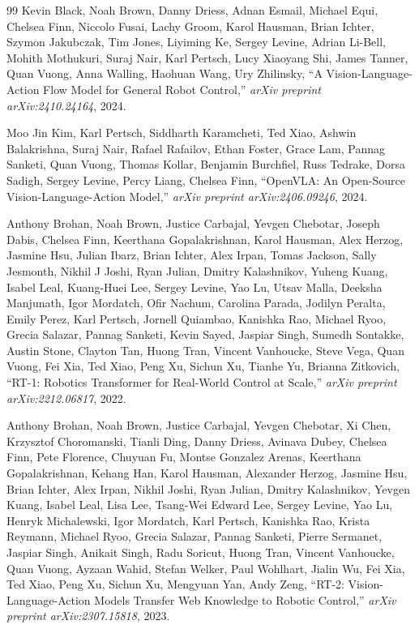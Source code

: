 \documentclass[11pt]{article}
\begin{document}
\begin{thebibliography}{99}
Kevin Black, Noah Brown, Danny Driess, Adnan Esmail, Michael Equi, Chelsea Finn, Niccolo Fusai, Lachy Groom, Karol Hausman, Brian Ichter, Szymon Jakubczak, Tim Jones, Liyiming Ke, Sergey Levine, Adrian Li-Bell, Mohith Mothukuri, Suraj Nair, Karl Pertsch, Lucy Xiaoyang Shi, James Tanner, Quan Vuong, Anna Walling, Haohuan Wang, Ury Zhilinsky,
``A Vision-Language-Action Flow Model for General Robot Control,''
\textit{arXiv preprint arXiv:2410.24164}, 2024.

Moo Jin Kim, Karl Pertsch, Siddharth Karamcheti, Ted Xiao, Ashwin Balakrishna, Suraj Nair, Rafael Rafailov, Ethan Foster, Grace Lam, Pannag Sanketi, Quan Vuong, Thomas Kollar, Benjamin Burchfiel, Russ Tedrake, Dorsa Sadigh, Sergey Levine, Percy Liang, Chelsea Finn,
``OpenVLA: An Open-Source Vision-Language-Action Model,''
\textit{arXiv preprint arXiv:2406.09246}, 2024.

Anthony Brohan, Noah Brown, Justice Carbajal, Yevgen Chebotar, Joseph Dabis, Chelsea Finn, Keerthana Gopalakrishnan, Karol Hausman, Alex Herzog, Jasmine Hsu, Julian Ibarz, Brian Ichter, Alex Irpan, Tomas Jackson, Sally Jesmonth, Nikhil J Joshi, Ryan Julian, Dmitry Kalashnikov, Yuheng Kuang, Isabel Leal, Kuang-Huei Lee, Sergey Levine, Yao Lu, Utsav Malla, Deeksha Manjunath, Igor Mordatch, Ofir Nachum, Carolina Parada, Jodilyn Peralta, Emily Perez, Karl Pertsch, Jornell Quiambao, Kanishka Rao, Michael Ryoo, Grecia Salazar, Pannag Sanketi, Kevin Sayed, Jaspiar Singh, Sumedh Sontakke, Austin Stone, Clayton Tan, Huong Tran, Vincent Vanhoucke, Steve Vega, Quan Vuong, Fei Xia, Ted Xiao, Peng Xu, Sichun Xu, Tianhe Yu, Brianna Zitkovich,
``RT-1: Robotics Transformer for Real-World Control at Scale,''
\textit{arXiv preprint arXiv:2212.06817}, 2022.

Anthony Brohan, Noah Brown, Justice Carbajal, Yevgen Chebotar, Xi Chen, Krzysztof Choromanski, Tianli Ding, Danny Driess, Avinava Dubey, Chelsea Finn, Pete Florence, Chuyuan Fu, Montse Gonzalez Arenas, Keerthana Gopalakrishnan, Kehang Han, Karol Hausman, Alexander Herzog, Jasmine Hsu, Brian Ichter, Alex Irpan, Nikhil Joshi, Ryan Julian, Dmitry Kalashnikov, Yevgen Kuang, Isabel Leal, Lisa Lee, Tsang-Wei Edward Lee, Sergey Levine, Yao Lu, Henryk Michalewski, Igor Mordatch, Karl Pertsch, Kanishka Rao, Krista Reymann, Michael Ryoo, Grecia Salazar, Pannag Sanketi, Pierre Sermanet, Jaspiar Singh, Anikait Singh, Radu Soricut, Huong Tran, Vincent Vanhoucke, Quan Vuong, Ayzaan Wahid, Stefan Welker, Paul Wohlhart, Jialin Wu, Fei Xia, Ted Xiao, Peng Xu, Sichun Xu, Mengyuan Yan, Andy Zeng,
``RT-2: Vision-Language-Action Models Transfer Web Knowledge to Robotic Control,''
\textit{arXiv preprint arXiv:2307.15818}, 2023.


\end{thebibliography}
\end{document}
